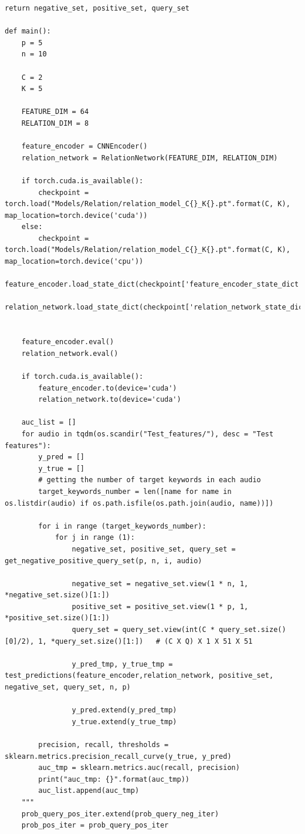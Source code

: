 \documentclass[12pt,a4paper,titlepage]{article}
\begin{document}
\begin{lstlisting}[language=iPython,firstnumber=1, caption=relation\_test.py, label=relation test,captionpos=b]
    return negative_set, positive_set, query_set

def main():
    p = 5
    n = 10

    C = 2
    K = 5

    FEATURE_DIM = 64
    RELATION_DIM = 8

    feature_encoder = CNNEncoder()
    relation_network = RelationNetwork(FEATURE_DIM, RELATION_DIM)

    if torch.cuda.is_available():
        checkpoint = torch.load("Models/Relation/relation_model_C{}_K{}.pt".format(C, K), map_location=torch.device('cuda'))
    else:
        checkpoint = torch.load("Models/Relation/relation_model_C{}_K{}.pt".format(C, K), map_location=torch.device('cpu'))
    feature_encoder.load_state_dict(checkpoint['feature_encoder_state_dict'])
    relation_network.load_state_dict(checkpoint['relation_network_state_dict'])


    feature_encoder.eval()
    relation_network.eval()

    if torch.cuda.is_available():
        feature_encoder.to(device='cuda')
        relation_network.to(device='cuda')

    auc_list = []
    for audio in tqdm(os.scandir("Test_features/"), desc = "Test features"):
        y_pred = []
        y_true = []
        # getting the number of target keywords in each audio
        target_keywords_number = len([name for name in os.listdir(audio) if os.path.isfile(os.path.join(audio, name))])

        for i in range (target_keywords_number):
            for j in range (1):
                negative_set, positive_set, query_set = get_negative_positive_query_set(p, n, i, audio)

                negative_set = negative_set.view(1 * n, 1, *negative_set.size()[1:])  
                positive_set = positive_set.view(1 * p, 1, *positive_set.size()[1:]) 
                query_set = query_set.view(int(C * query_set.size()[0]/2), 1, *query_set.size()[1:])   # (C X Q) X 1 X 51 X 51
                
                y_pred_tmp, y_true_tmp = test_predictions(feature_encoder,relation_network, positive_set, negative_set, query_set, n, p)

                y_pred.extend(y_pred_tmp)
                y_true.extend(y_true_tmp)

        precision, recall, thresholds = sklearn.metrics.precision_recall_curve(y_true, y_pred)
        auc_tmp = sklearn.metrics.auc(recall, precision)
        print("auc_tmp: {}".format(auc_tmp))
        auc_list.append(auc_tmp)
    """
    prob_query_pos_iter.extend(prob_query_neg_iter)
    prob_pos_iter = prob_query_pos_iter


\end{lstlisting}
\end{document}
